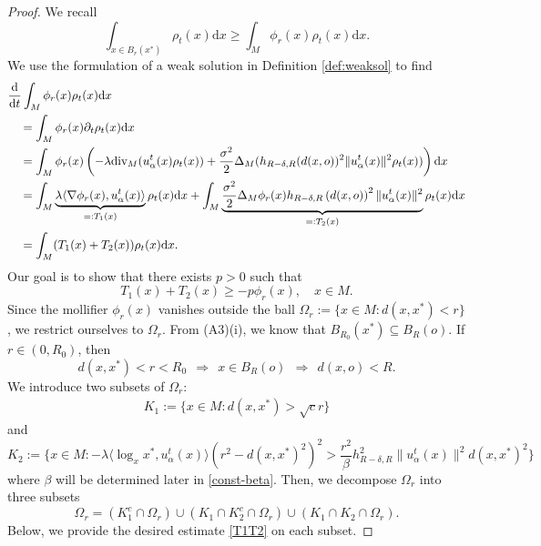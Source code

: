 \documentclass[11pt]{amsart}
\def\d{\mathrm{d}}
\newcommand{\p}{o}%
\newcommand{\dist}{d}%
\begin{document}
\begin{proof}
We recall
\[
\int_{x\in B_r(x^*)} \rho_t(x) \d x  \geq \int_M \phi_r(x) \rho_t(x) \d x .
\]
We use the formulation of a weak solution in Definition \ref{def:weaksol} to find
\begin{align*}
&\frac{\d}{\d t} \int_M \phi_r(x) \rho_t(x) \d x \\
&\quad = \int_M \phi_r(x) \partial_t \rho_t(x) \d x  \\
&\quad =\int_M   \phi_r(x) \left(   -\lambda \textup{div}_M (u_\alpha^t(x) \rho_t(x) ) + \frac{\sigma^2}{2} \Delta_M (  h_{R-\delta,R}(d(x,o))^2 \|u_\alpha^t(x)\|^2 \rho_t(x) )        \right) \d x \\ 
&\quad =   \int_M  \underbrace{  \lambda   \langle  \nabla \phi_r(x), u_\alpha^t(x) \rangle}_{=:T_1(x)} \rho_t(x) \d x        + \int_M \underbrace{ \frac{\sigma^2}{2}\Delta_M \phi_r(x) h_{R-\delta,R}\left(\dist(x, \p)\right)^2 \|u_\alpha^t(x)\|^2 }_{=: T_2(x)}\rho_t(x) \d x  \\
&\quad  = \int_M (T_1(x) + T_2(x) ) \rho_t(x) \d x .
\end{align*}
Our goal is to show that there exists $p>0$ such that 
\begin{equation} \label{T1T2}
T_1(x) + T_2(x) \geq -p\phi_r(x),\quad x\in M .
\end{equation}
Since the mollifier $\phi_r(x)$ vanishes outside the ball $\Omega_r := \{ x\in M : d(x,x^*) <r\}$, we restrict ourselves to $\Omega_r$.  From (A3)(i), we know that $B_{R_0}(x^*) \subseteq B_R(o)$. If $r\in (0,R_0)$, then
\[
d(x,x^*)<r <R_0 ~~ \Longrightarrow ~~x\in B_R(o) ~~ \Longrightarrow ~~d(x,o)<R.
\]
 We introduce two subsets of $\Omega_r$:
\begin{align*}
K_1 := \{ x\in M: d(x,x^*) >\sqrt{c}r\}
\end{align*}
and  
\begin{equation} \label{K2}
K_2 := \{ x\in M: - \lambda \langle \log_xx^*,u_\alpha^t(x)\rangle (r^2 - d(x,x^*)^2)^2 > \frac{r^2}{\beta}h_{R-\delta,R}^2 \|u_\alpha^t(x)\|^2 d(x,x^*)^2 \}
\end{equation}
where $\beta$ will be determined  later in \eqref{const-beta}. Then, we decompose $\Omega_r$ into three subsets
\[
\Omega_r = (K_1^c \cap \Omega_r) \cup (K_1\cap K_2^c \cap\Omega_r) \cup ( K_1\cap K_2\cap \Omega_r).
\]
Below,  we provide the desired estimate \eqref{T1T2} on each subset. \newline



\end{proof}
\end{document}
